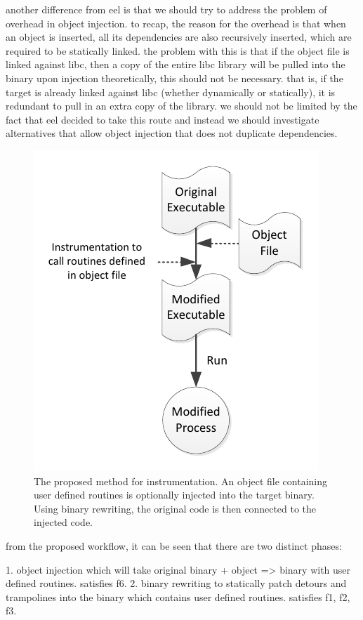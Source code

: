 another difference from eel is that we should try to address the problem of overhead in object injection. to recap, the reason for the overhead is that when an object is inserted, all its dependencies are also recursively inserted, which are required to be statically linked. the problem with this is that if the object file is linked against libc, then a copy of the entire libc library will be pulled into the binary upon injection 
theoretically, this should not be necessary. that is, if the target is already linked against libc (whether dynamically or statically), it is redundant to pull in an extra copy of the library. we should not be limited by the fact that eel decided to take this route and instead we should investigate alternatives that allow object injection that does not duplicate dependencies.

\begin{figure}[H]
 \centering
 \includegraphics{Workflow.pdf}
 \caption[Hierarchy]{The proposed method for instrumentation. An object file containing user defined routines is optionally injected into the target binary. Using binary rewriting, the original code is then connected to the injected code.}
\label{fig:Workflow}
\end{figure}

from the proposed workflow, it can be seen that there are two distinct phases:

1. object injection which will take original binary + object => binary with user defined routines. satisfies f6.
2. binary rewriting to statically patch detours and trampolines into the binary which contains user defined routines. satisfies f1, f2, f3.

